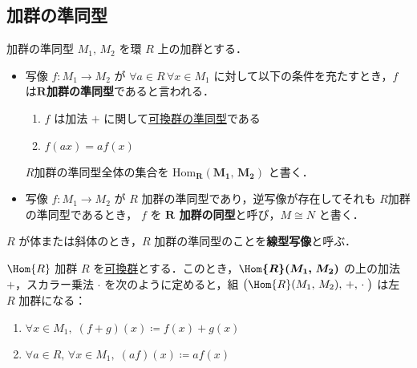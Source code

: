 \documentclass[geometry_main]{subfiles}
\begin{document}
\subsection{加群の準同型}
\begin{mydef}[label=def:homo-module]{加群の準同型}
	$M_1,\, M_2$ を環 $R$ 上の加群とする．
    \begin{itemize}
        \item 写像 $f \colon M_1 \to M_2$ が $\forall a \in R\, \forall x \in M_1$ に対して以下の条件を充たすとき，$f$ は\textbf{$\bm{R}$加群の準同型}であると言われる．
		\begin{enumerate}
			\item $f$ は加法 $+$ に関して\hyperref[def.hom_group]{可換群の準同型}である
			\item $f(ax) = a f(x)$
		\end{enumerate}
        $R$加群の準同型全体の集合を $\bm{\mathrm{Hom}_R (M_1,\, M_2)}$ と書く．
        \item  写像 $f \colon M_1 \to M_2$ が $R$ 加群の準同型であり，逆写像が存在してそれも $R$加群の準同型であるとき， $f$ を\textbf{ $\bm{R}$ 加群の同型}と呼び，$M \cong N$ と書く．
    \end{itemize}
	$R$ が体または斜体のとき，$R$ 加群の準同型のことを\textbf{線型写像}と呼ぶ．
\end{mydef}

\begin{myprop}[label=def:hom-hom]{$\Hom{R}$ 加群}
	$R$ を\underline{可換群}とする．このとき，$\bm{\Hom{R} (M_1,\, M_2)}$ の上の加法 $+$，スカラー乗法 $\cdot$ を次のように定めると，組 $\bigl(\Hom{R} (M_1,\, M_2),\, +,\, \cdot\mathrel{}\bigr)$ は左 $R$ 加群になる：
	\begin{enumerate}
		\item $\forall x \in M_1,\; (f+g)(x) \coloneqq f(x) + g(x)$
		\item $\forall a  \in R,\, \forall x \in M_1,\; (af)(x) \coloneqq af(x)$
	\end{enumerate}
\end{myprop}
\end{document}
